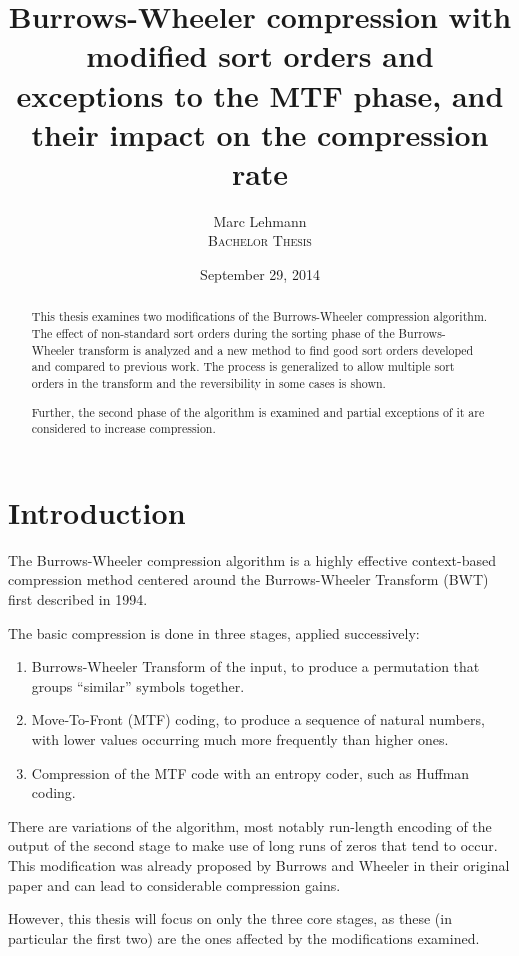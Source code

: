 \documentclass[a4paper]{scrreprt}
\title{Burrows-Wheeler compression with modified sort orders and exceptions to
the MTF phase, and their impact on the compression rate}
\date{September 29, 2014}
\author{Marc Lehmann \\ \textsc{Bachelor Thesis}}
\begin{document}
\maketitle

\begin{abstract}
This thesis examines two modifications of the Burrows-Wheeler compression
algorithm. The effect of non-standard sort orders during the sorting phase of
the Burrows-Wheeler transform is analyzed and a new method to find good sort
orders developed and compared to previous work. The process is generalized to
allow multiple sort orders in the transform and the reversibility in some cases
is shown.

Further, the second phase of the algorithm is examined and partial exceptions of
it are considered to increase compression.
\end{abstract}

\tableofcontents

\chapter{Introduction}

The Burrows-Wheeler compression algorithm is a highly effective context-based
compression method centered around the Burrows-Wheeler Transform (BWT) first
described in 1994\cite{burrowswheeler1994bwt}.

The basic compression is done in three stages, applied successively:
\begin{enumerate}
  \item Burrows-Wheeler Transform of the input, to produce a permutation that
  groups ``similar'' symbols together.
  \item Move-To-Front (MTF) coding, to produce a sequence of natural numbers,
  with lower values occurring much more frequently than higher ones.
  \item Compression of the MTF code with an entropy coder, such as Huffman
  coding.
\end{enumerate}
There are variations of the algorithm, most notably run-length encoding of the
output of the second stage to make use of long runs of zeros that tend to occur.
This modification was already proposed by Burrows and Wheeler in their original
paper and can lead to considerable compression gains.

However, this thesis will focus on only the three core stages, as these (in
particular the first two) are the ones affected by the modifications examined.
\end{document}
